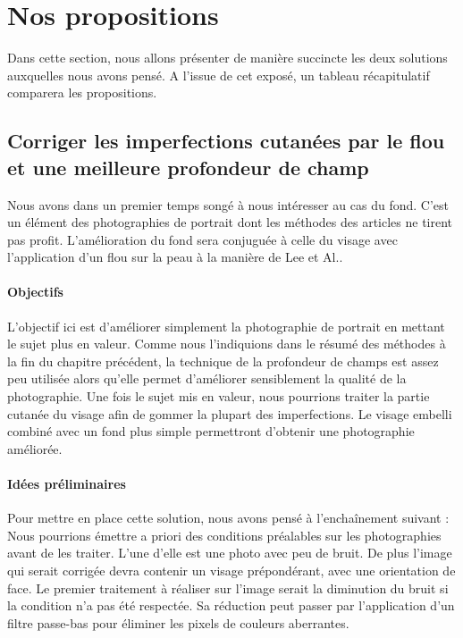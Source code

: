 \documentclass[11pt, french,screen]{report-rd-info}
\begin{document}
\section{Nos propositions}
Dans cette section, nous allons présenter de manière succincte les deux solutions auxquelles nous avons pensé. A l’issue de cet exposé, un tableau récapitulatif comparera les propositions.
\subsection{Corriger les imperfections cutanées par le flou et une meilleure profondeur de champ}
\label{propun}
Nous avons dans un premier temps songé à nous intéresser au cas du fond. C’est un élément des photographies de portrait dont les méthodes des articles ne tirent pas profit. L’amélioration du fond sera conjuguée à celle du visage avec l’application d’un flou sur la peau à la manière de Lee et Al.\cite{Lee}.
\paragraph{Objectifs}
L’objectif ici est d’améliorer simplement la photographie de portrait en mettant le sujet plus en valeur. Comme nous l’indiquions dans le résumé des méthodes à la fin du chapitre précédent, la technique de la profondeur de champs est assez peu utilisée alors qu’elle permet d’améliorer sensiblement la qualité de la photographie. Une fois le sujet mis en valeur, nous pourrions traiter la partie cutanée du visage afin de gommer la plupart des imperfections. Le visage embelli combiné avec un fond plus simple permettront d’obtenir une photographie améliorée.
\paragraph{Idées préliminaires}
Pour mettre en place cette solution, nous avons pensé à l'enchaînement suivant :
Nous pourrions émettre a priori des conditions préalables sur les photographies avant de les traiter. L’une d’elle est une photo avec peu de bruit. De plus l’image qui serait corrigée devra contenir un visage prépondérant, avec une orientation de face.
Le premier traitement à réaliser sur l’image serait la diminution du bruit si la condition n’a pas été respectée. Sa réduction peut passer par l’application d’un filtre passe-bas pour éliminer les pixels de couleurs aberrantes.
\end{document}
